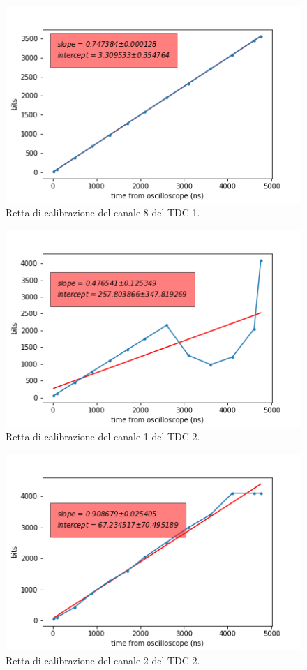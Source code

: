 \begin{figure}[H]
  \centering
  \includegraphics[width=.8\textwidth]{plots/tdc18.png}
  \caption{Retta di calibrazione del canale 8 del TDC 1.}
  \label{fig:tdc18}
\end{figure}

\begin{figure}[H]
  \centering
  \includegraphics[width=.8\textwidth]{plots/tdc21.png}
  \caption{Retta di calibrazione del canale 1 del TDC 2.}
  \label{fig:tdc21}
\end{figure}

\begin{figure}[H]
  \centering
  \includegraphics[width=.8\textwidth]{plots/tdc22.png}
  \caption{Retta di calibrazione del canale 2 del TDC 2.}
  \label{fig:tdc22}
\end{figure}

